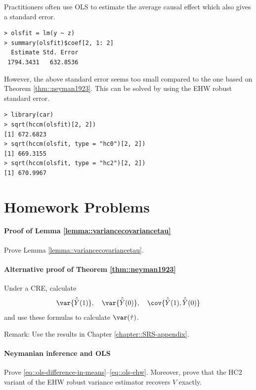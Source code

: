 Practitioners often use OLS to estimate the average causal effect which also gives a standard error. 
\begin{lstlisting}
> olsfit = lm(y ~ z)
> summary(olsfit)$coef[2, 1: 2]
  Estimate Std. Error 
 1794.3431   632.8536 
 \end{lstlisting} 
However, the above standard error seems too small compared to the one based on  Theorem \ref{thm::neyman1923}.  This can be solved by using the EHW robust standard error. 
\begin{lstlisting}
> library(car)
> sqrt(hccm(olsfit)[2, 2])
[1] 672.6823
> sqrt(hccm(olsfit, type = "hc0")[2, 2])
[1] 669.3155
> sqrt(hccm(olsfit, type = "hc2")[2, 2])
[1] 670.9967
 \end{lstlisting} 





\section{Homework Problems}

\paragraph{Proof of Lemma \ref{lemma::variancecovariancetau}}\label{hw::proof-covariance-basic}


Prove Lemma \ref{lemma::variancecovariancetau}. 


\paragraph{Alternative proof of Theorem \ref{thm::neyman1923}}\label{hw::neyman-alternative-proof}


Under a CRE, calculate 
$$
\var\{  \hat{\bar{Y}}(1)  \} ,\quad
\var\{  \hat{\bar{Y}}(0)  \} ,\quad
\cov\{  \hat{\bar{Y}}(1) ,  \hat{\bar{Y}}(0)  \} 
$$
and use these formulas to calculate $\var(\hat{\tau} )$. 

Remark: Use the results in Chapter \ref{chapter::SRS-appendix}. 





\paragraph{Neymanian inference and OLS}
\label{hw::neyman-ols-nox}


Prove \eqref{eq::ols-difference-in-means}--\eqref{eq::ols-ehw}. Moreover, prove that the HC2 variant of the EHW robust variance estimator recovers $\hat{V}$ exactly. 


